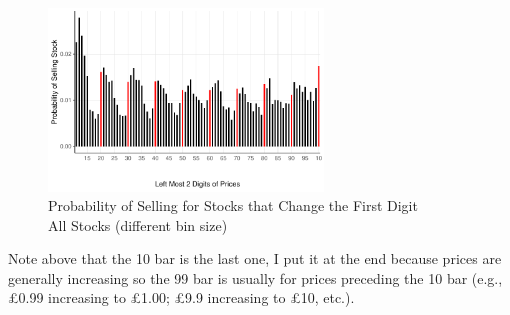 \begin{figure}[hbt!]
	\centering%
	\caption{Probability of Selling  for Stocks that Change the First Digit \\ All Stocks (different bin size)}%
	\label{fig:all_obs}%
	\includegraphics[width=0.65\textwidth]{figures/2left_increase.pdf}
	\fignote{}
\end{figure}

Note above that the 10 bar is the last one, I put it at the end because prices are generally increasing so the 99 bar is usually for prices preceding the 10 bar (e.g., £0.99 increasing to £1.00; £9.9 increasing to £10, etc.).

